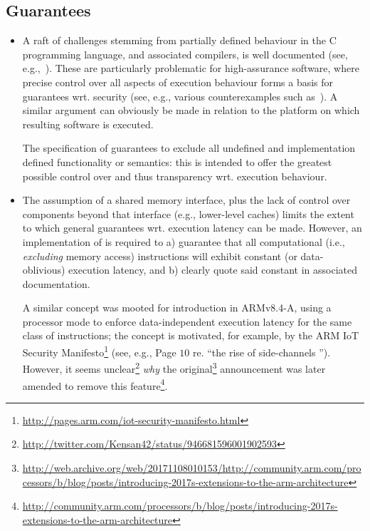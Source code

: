 
\subsection{Guarantees}
\label{sec:bg:guarantee}

\begin{itemize}

\item A raft of challenges stemming from partially defined behaviour in the
      C programming language, and associated compilers, is well documented
      (see, e.g.,~\cite[Section 2.1]{SCARV:SimChiAnd:18}).
      These are particularly problematic for high-assurance software, where
      precise control over all aspects of execution behaviour forms a basis
      for guarantees wrt. security
      (see, e.g., various counterexamples such as~\cite{SCARV:KPVV:16}).
      A similar argument can obviously be made in relation to the platform 
      on which resulting software is executed.

      The specification of \XCID guarantees to exclude all
                   undefined 
      and
      implementation defined
      functionality or semantics:
      this is intended to offer the greatest possible control over and thus
      transparency wrt. execution behaviour.

\item The assumption of a shared memory interface, plus the lack of control
      over components beyond that interface 
      (e.g., lower-level caches) 
      limits the extent to which general guarantees wrt. execution latency 
      can be made.  However, an implementation of \XCID is required to 
      a) guarantee that all computational 
         (i.e., {\em excluding} memory access) 
         instructions will exhibit constant (or data-oblivious) execution 
         latency,
         and
      b) clearly quote said constant in associated documentation.

      A similar concept was mooted for introduction in ARMv8.4-A, using a
      processor mode to enforce data-independent execution latency for the
      same class of instructions; the concept is motivated, for example,
      by the ARM IoT Security Manifesto\footnote{
      \url{http://pages.arm.com/iot-security-manifesto.html}
      } (see, e.g., Page $10$ re. ``the rise of side-channels '').
      However, it seems unclear\footnote{
      \url{http://twitter.com/Kensan42/status/946681596001902593}
      } {\em why} the original\footnote{
      \url{http://web.archive.org/web/20171108010153/http://community.arm.com/processors/b/blog/posts/introducing-2017s-extensions-to-the-arm-architecture}
      } announcement was later amended to remove this feature\footnote{
      \url{http://community.arm.com/processors/b/blog/posts/introducing-2017s-extensions-to-the-arm-architecture}
      }.

\end{itemize}

